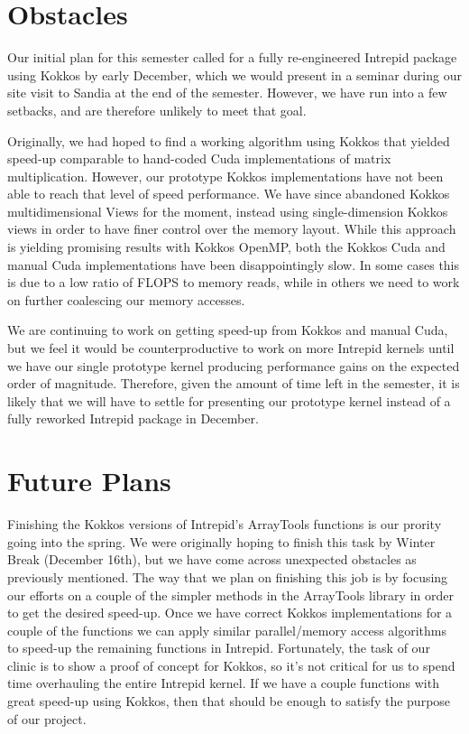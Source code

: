 \documentclass{hmcclinic}
\begin{document}
\section*{Obstacles}
Our initial plan for this semester called for a fully re-engineered Intrepid
package using Kokkos by early December, which we would present in a seminar
during our site visit to Sandia at the end of the semester.  However, we have
run into a few setbacks, and are therefore unlikely to meet that goal.

Originally, we had hoped to find a working algorithm using Kokkos that yielded
speed-up comparable to hand-coded Cuda implementations of matrix multiplication.  
However, our prototype Kokkos implementations have not been able to reach that level of
speed performance.
We have since abandoned Kokkos multidimensional Views for the moment, instead
using single-dimension Kokkos views in order to have finer control over the
memory layout.  While this approach is yielding promising results with Kokkos
OpenMP, both the Kokkos Cuda and manual Cuda implementations have been
disappointingly slow. In some cases this is due to a low ratio of FLOPS to memory
reads, while in others we need to work on further coalescing our memory accesses. 

We are continuing to work on getting speed-up from Kokkos and manual Cuda, but
we feel it would be counterproductive to work on more Intrepid kernels until we
have our single prototype kernel producing performance gains on the expected
order of magnitude.  Therefore, given the amount of time left in the semester,
it is likely that we will have to settle for presenting our prototype kernel
instead of a fully reworked Intrepid package in December. 

\section*{Future Plans}
Finishing the Kokkos versions of Intrepid's ArrayTools functions is our prority
going into the spring.  We were originally hoping to finish this task by Winter
Break (December 16th), but we have come across unexpected obstacles as
previously mentioned. The way that we plan on finishing this job is by focusing
our efforts on a couple of the simpler methods in the ArrayTools library in
order to get the desired speed-up. Once we have correct Kokkos implementations
for a couple of the functions we can apply similar parallel/memory access
algorithms to speed-up the remaining functions in Intrepid. Fortunately, the
task of our clinic is to show a proof of concept for Kokkos, so it's not
critical for us to spend time overhauling the entire Intrepid kernel.  If we
have a couple functions  with great speed-up using Kokkos, then that should be
enough to satisfy the purpose of our project. 
\end{document}
